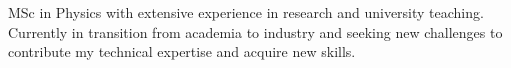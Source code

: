 
MSc in Physics with extensive experience in research and university teaching. Currently in transition from academia to industry and seeking new challenges to contribute my technical expertise and acquire new skills.
